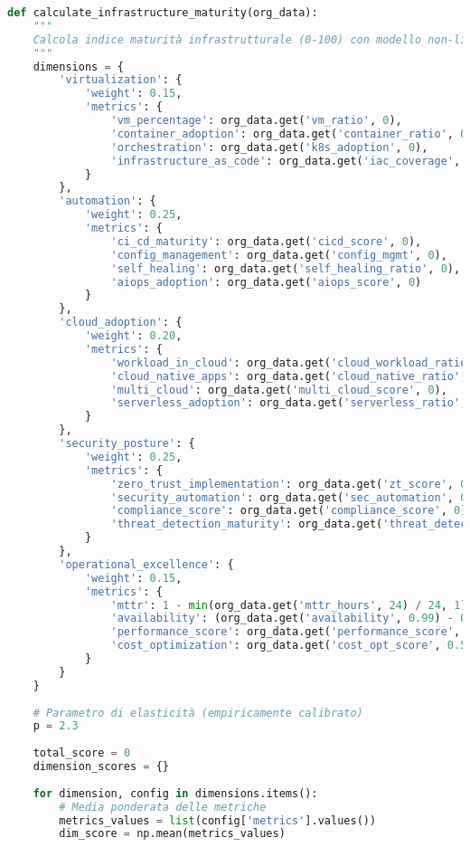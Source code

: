 \begin{lstlisting}[language=Python, caption=Calcolo Indice Maturità con Elasticità Non-Lineare]
def calculate_infrastructure_maturity(org_data):
    """
    Calcola indice maturità infrastrutturale (0-100) con modello non-lineare
    """
    dimensions = {
        'virtualization': {
            'weight': 0.15,
            'metrics': {
                'vm_percentage': org_data.get('vm_ratio', 0),
                'container_adoption': org_data.get('container_ratio', 0),
                'orchestration': org_data.get('k8s_adoption', 0),
                'infrastructure_as_code': org_data.get('iac_coverage', 0)
            }
        },
        'automation': {
            'weight': 0.25,
            'metrics': {
                'ci_cd_maturity': org_data.get('cicd_score', 0),
                'config_management': org_data.get('config_mgmt', 0),
                'self_healing': org_data.get('self_healing_ratio', 0),
                'aiops_adoption': org_data.get('aiops_score', 0)
            }
        },
        'cloud_adoption': {
            'weight': 0.20,
            'metrics': {
                'workload_in_cloud': org_data.get('cloud_workload_ratio', 0),
                'cloud_native_apps': org_data.get('cloud_native_ratio', 0),
                'multi_cloud': org_data.get('multi_cloud_score', 0),
                'serverless_adoption': org_data.get('serverless_ratio', 0)
            }
        },
        'security_posture': {
            'weight': 0.25,
            'metrics': {
                'zero_trust_implementation': org_data.get('zt_score', 0),
                'security_automation': org_data.get('sec_automation', 0),
                'compliance_score': org_data.get('compliance_score', 0),
                'threat_detection_maturity': org_data.get('threat_detect', 0)
            }
        },
        'operational_excellence': {
            'weight': 0.15,
            'metrics': {
                'mttr': 1 - min(org_data.get('mttr_hours', 24) / 24, 1),
                'availability': (org_data.get('availability', 0.99) - 0.95) / 0.0499,
                'performance_score': org_data.get('performance_score', 0.5),
                'cost_optimization': org_data.get('cost_opt_score', 0.5)
            }
        }
    }
    
    # Parametro di elasticità (empiricamente calibrato)
    p = 2.3
    
    total_score = 0
    dimension_scores = {}
    
    for dimension, config in dimensions.items():
        # Media ponderata delle metriche
        metrics_values = list(config['metrics'].values())
        dim_score = np.mean(metrics_values)
        

\end{lstlisting}
